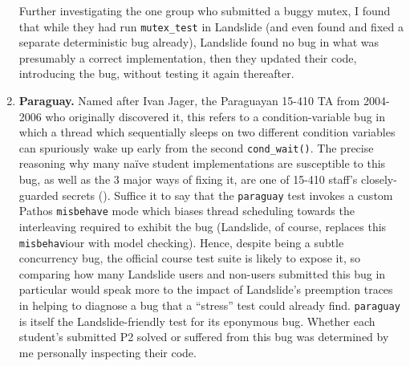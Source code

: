 \begin{enumerate}
Further investigating the one group who submitted a buggy mutex,
I found that while they had run {\tt mutex\_test} in Landslide
(and even found and fixed a separate deterministic bug already),
Landslide found no bug in what was presumably a correct implementation,
then they updated %
their code, introducing the bug, without testing it again thereafter.

\item
{\bf Paraguay.}
Named after Ivan Jager, the Paraguayan 15-410 TA from 2004-2006 who originally discovered it,
this refers to a condition-variable bug in which a thread which sequentially sleeps on two different condition variables
can spuriously wake up early from the second {\tt cond\_wait()}.
The precise reasoning why many na\"ive student implementations are susceptible to this bug,
as well as the 3 major ways of fixing it,
are one of 15-410 staff's closely-guarded secrets (\sect{\ref{sec:410-secrecy}}).
Suffice it to say that the {\tt paraguay} test invokes a custom Pathos {\tt misbehave} mode
which biases thread scheduling towards the interleaving required to exhibit the bug
(Landslide, of course, replaces this {\tt misbehav}iour with model checking).
Hence, despite being a subtle concurrency bug,
the official course test suite is likely to expose it,
so comparing how many Landslide users and non-users submitted this bug in particular
would speak more to the impact of Landslide's preemption traces
in helping to diagnose a bug that a ``stress'' test could already find.
%
{\tt paraguay} is itself the Landslide-friendly test for its eponymous bug.
Whether each student's submitted P2 solved or suffered from this bug
was determined by me personally inspecting their code.


\end{enumerate}
